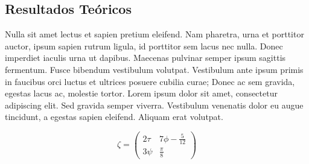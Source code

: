 \subsection{Resultados Teóricos}
Nulla sit amet lectus et sapien pretium eleifend. Nam pharetra, urna et porttitor auctor, ipsum sapien rutrum ligula, id porttitor sem lacus nec nulla. Donec imperdiet iaculis urna ut dapibus. Maecenas pulvinar semper ipsum sagittis fermentum. Fusce bibendum vestibulum volutpat. Vestibulum ante ipsum primis in faucibus orci luctus et ultrices posuere cubilia curae; Donec ac sem gravida, egestas lacus ac, molestie tortor. Lorem ipsum dolor sit amet, consectetur adipiscing elit. Sed gravida semper viverra. Vestibulum venenatis dolor eu augue tincidunt, a egestas sapien eleifend. Aliquam erat volutpat. 

$$
    \zeta = \left( \begin{array}{cc}
        2\tau & 7\phi-\frac{5}{12} \\
        3 \psi & \frac{\pi}{8}
    \end{array} \right)
    
$$